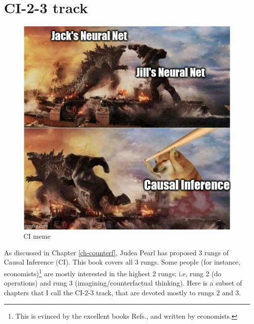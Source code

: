 \chapter*{CI-2-3 track}
\label{ci-track}

\begin{figure}[h!]
\centering
\includegraphics[width=5in]
{godzilla-kk-doge-nn-ci.jpg}
\caption{CI meme} 
\label{fig-godzilla-kk-doge}
\end{figure}

As discussed in Chapter \ref{ch-counterf},
Judea Pearl has proposed 3 rungs 
of Causal Inference (CI).
This book covers all 3 rungs.
Some people (for instance,
economists)\footnote{This is evinced by
the excellent books Refs.\cite{book-mixtape},
and \cite{alves-book}
written by economists.}
are mostly interested in the highest
2 rungs; i.e, 
rung 2 (do operations)
and rung 3 (imagining/counterfactual thinking).
Here is a subset of chapters
that I call
the CI-2-3 track,
that are devoted mostly to rungs 2 and 3. 


